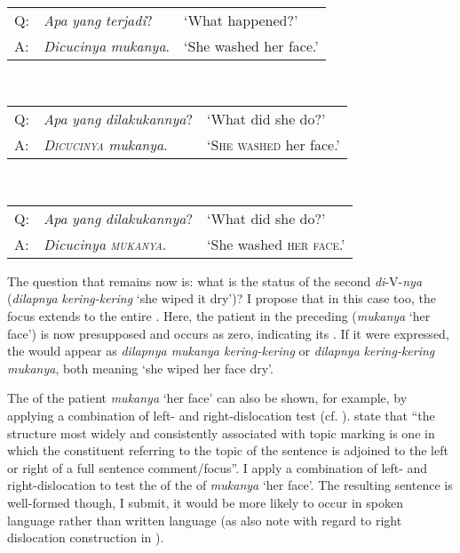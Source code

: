 \documentclass[output=paper
,modfonts
,nonflat]{langsci/langscibook}
\begin{document}
\begin{exe}
	\ex\label{e:djenar:29}
	\begin{xlist}
		\label{e:djenar:29a}\\
		\begin{tabular}{lll}
			Q: & \textit{Apa} \textit{yang} \textit{terjadi}? & ‘What happened?’\\
			A: & \textit{Dicucinya} \textit{mukanya}. & ‘She washed her face.’\\
		\end{tabular}
		\label{e:djenar:29b}\\
		\begin{tabular}{lll}
			Q: & \textit{Apa} \textit{yang} \textit{dilakukannya}? & ‘What did she do?’\\
			A: & \textsc{\textit{Dicucinya}} \textit{mukanya}. & ‘\textsc{She} \textsc{washed} her face.’\\
		\end{tabular}
		\label{e:djenar:29c}\\
		\begin{tabular}{lll}
			Q: & \textit{Apa} \textit{yang} \textit{dilakukannya}? & ‘What did she do?’\\
			A: & \textit{Dicucinya} \textsc{\textit{mukanya}}. & ‘She washed \textsc{her face}.’\\
		\end{tabular}
	\end{xlist}
\end{exe}

\noindent
The question that remains now is: what is the status of the second \textit{di}-V-\textit{nya}  (\textit{dilapnya} \textit{kering-kering} ‘she wiped it dry’)? I propose that in this case too, the focus extends to the entire . Here, the patient in the preceding  (\textit{mukanya} ‘her face’) is now presupposed and occurs as zero, indicating its . If it were expressed, the  would appear as \textit{dilapnya mukanya kering-kering} or \textit{dilapnya} \textit{kering-kering mukanya}, both meaning ‘she wiped her face dry’. 

The  of the patient \textit{mukanya} ‘her face’ can also be shown, for example, by applying a combination of left- and right-dislocation test (cf. \citealt[186]{Gundel2004}). \citet[186]{Gundel2004} state that “the structure most widely and consistently associated with topic marking is one in which the constituent referring to the topic of the sentence is adjoined to the left or right of a full sentence comment/focus”. I apply a combination of left- and right-dislocation to test the  of the  of \textit{mukanya} ‘her face’. The resulting sentence is well-formed though, I submit, it would be more likely to occur in spoken language rather than written language (as \citet[188]{Gundel2004} also note with regard to right dislocation construction in ). 
\end{document}
